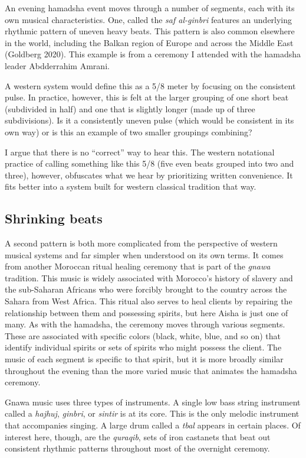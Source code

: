 \documentclass[twoside]{article}
\begin{document}
An evening hamadsha event moves through a number of segments, each with
its own musical characteristics. One, called the \emph{saf al-ginbri}
features an underlying rhythmic pattern of uneven heavy beats. This
pattern is also common elsewhere in the world, including the Balkan
region of Europe and across the Middle East (Goldberg 2020). This
example is from a ceremony I attended with the hamadsha leader
Abdderrahim Amrani.

A western system would define this as a 5/8 meter by focusing on the
consistent pulse. In practice, however, this is felt at the larger
grouping of one short beat (subdivided in half) and one that is slightly
longer (made up of three subdivisions). Is it a consistently uneven
pulse (which would be consistent in its own way) or is this an example
of two smaller groupings combining?

\hypertarget{example18}{}

I argue that there is no ``correct'' way to hear this. The western
notational practice of calling something like this 5/8 (five even beats
grouped into two and three), however, obfuscates what we hear by
prioritizing written convenience. It fits better into a system built for
western classical tradition that way.

\hypertarget{shrinking-beats}{%
\subsection{Shrinking beats}\label{shrinking-beats}}

A second pattern is both more complicated from the perspective of
western musical systems and far simpler when understood on its own
terms. It comes from another Moroccan ritual healing ceremony that is
part of the \emph{gnawa} tradition. This music is widely associated with
Morocco's history of slavery and the sub-Saharan Africans who were
forcibly brought to the country across the Sahara from West Africa. This
ritual also serves to heal clients by repairing the relationship between
them and possessing spirits, but here Aisha is just one of many. As with
the hamadsha, the ceremony moves through various segments. These are
associated with specific colors (black, white, blue, and so on) that
identify individual spirits or sets of spirits who might possess the
client. The music of each segment is specific to that spirit, but it is
more broadly similar throughout the evening than the more varied music
that animates the hamadsha ceremony.

Gnawa music uses three types of instruments. A single low bass string
instrument called a \emph{hajhuj}, \emph{ginbri}, or \emph{sintir} is at
its core. This is the only melodic instrument that accompanies singing.
A large drum called a \emph{tbal} appears in certain places. Of interest
here, though, are the \emph{quraqib}, sets of iron castanets that beat
out consistent rhythmic patterns throughout most of the overnight
ceremony.
\end{document}
